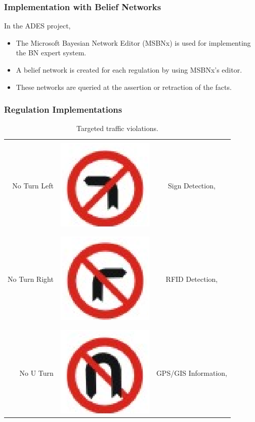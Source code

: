 \documentclass{beamer}
\begin{document}
\frame
{
	\frametitle{Implementation with Belief Networks}
	In the ADES project, 
	\begin{itemize}
		\item The Microsoft Bayesian Network Editor (MSBNx) is used for implementing the BN expert system.
		\item A belief network is created for each regulation by using MSBNx's editor.
		\item These networks are queried at the assertion or retraction of the facts.
	\end{itemize}
}

\frame
{
  \frametitle{Regulation Implementations}
  \begin{table}[!ht]
	\caption{Targeted traffic violations.}
	\centering
	{\tiny
	\begin{tabular}{|r|r|c|}
	\hline
	&&\\
	{\scriptsize No Turn Left} & \includegraphics[scale=0.17]{../img/noleft} & {\scriptsize Sign Detection,}\\
	&&\\
	\cline{1-2}
	&&\\
	{\scriptsize No Turn Right} & \includegraphics[scale=0.17]{../img/noright} & {\scriptsize RFID Detection,}\\
	&&\\
	\cline{1-2}
	&&\\
	{\scriptsize No U Turn} & \includegraphics[scale=0.17]{../img/nouturn} & {\scriptsize GPS/GIS Information,}\\

\end{tabular}}
\end{table}}
\end{document}

